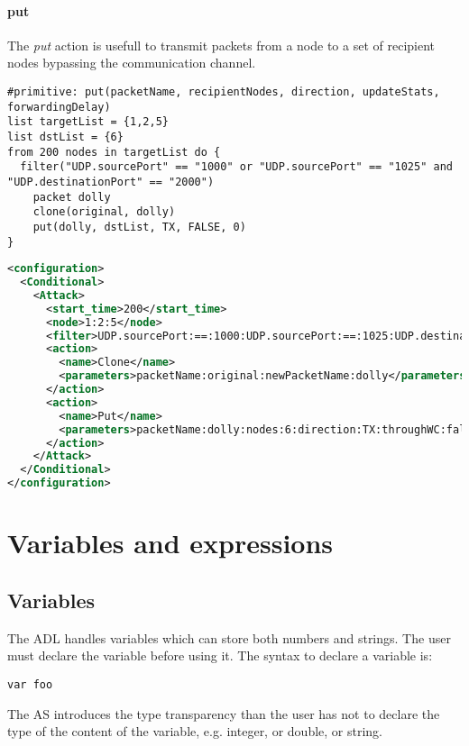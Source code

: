 \paragraph{put}
The \emph{put} action is usefull to transmit packets from a node to a set of recipient nodes bypassing the communication channel.
%
\begin{lstlisting}[language={asl},caption={ASL put example}]
#primitive: put(packetName, recipientNodes, direction, updateStats, forwardingDelay)
list targetList = {1,2,5}
list dstList = {6}
from 200 nodes in targetList do {
  filter("UDP.sourcePort" == "1000" or "UDP.sourcePort" == "1025" and "UDP.destinationPort" == "2000")
    packet dolly
    clone(original, dolly)
    put(dolly, dstList, TX, FALSE, 0)
}
\end{lstlisting}
%
\begin{lstlisting}[language={xml},caption={Interpreter output}]
<configuration>
  <Conditional>
    <Attack>
      <start_time>200</start_time>
      <node>1:2:5</node>
      <filter>UDP.sourcePort:==:1000:UDP.sourcePort:==:1025:UDP.destinationPort:==:2000:AND:OR</filter>
      <action>
        <name>Clone</name>          
        <parameters>packetName:original:newPacketName:dolly</parameters>                        
      </action>
      <action>
        <name>Put</name>
        <parameters>packetName:dolly:nodes:6:direction:TX:throughWC:false:delay:0</parameters>
      </action>
    </Attack>
  </Conditional>
</configuration>
\end{lstlisting}



\section{Variables and expressions}

\subsection{Variables}
The ADL handles variables which can store both numbers and strings. The user must declare the variable before using it. The syntax to declare a variable is:
%
\begin{lstlisting}[language={asl}, caption={Syntax to declare a variable}]
var foo
\end{lstlisting}
%
The AS introduces the type transparency than the user has not to declare the type of the content of the variable, e.g. integer, or double, or string. 

